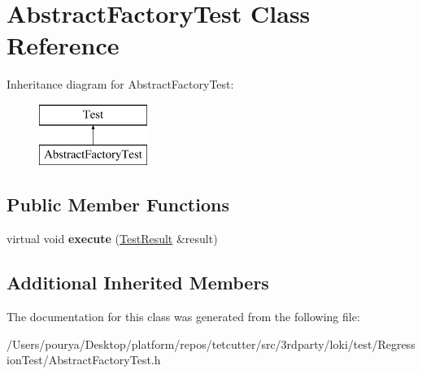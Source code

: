 \hypertarget{classAbstractFactoryTest}{}\section{Abstract\+Factory\+Test Class Reference}
\label{classAbstractFactoryTest}
Inheritance diagram for Abstract\+Factory\+Test\+:\begin{figure}[H]
\begin{center}
\leavevmode
\includegraphics[height=2.000000cm]{classAbstractFactoryTest}
\end{center}
\end{figure}
\subsection*{Public Member Functions}
\begin{DoxyCompactItemize}
\item 
\hypertarget{classAbstractFactoryTest_aab3de5ad2452790e7b18750d3afdbba8}{}virtual void {\bfseries execute} (\hyperlink{classTestResult}{Test\+Result} \&result)\label{classAbstractFactoryTest_aab3de5ad2452790e7b18750d3afdbba8}

\end{DoxyCompactItemize}
\subsection*{Additional Inherited Members}


The documentation for this class was generated from the following file\+:\begin{DoxyCompactItemize}
\item 
/\+Users/pourya/\+Desktop/platform/repos/tetcutter/src/3rdparty/loki/test/\+Regression\+Test/Abstract\+Factory\+Test.\+h\end{DoxyCompactItemize}
